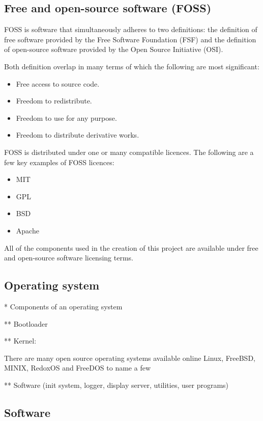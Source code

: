 \subsection{Free and open-source software (FOSS)}

FOSS is software that simultaneously adheres to two definitions: the definition of free software provided by the Free Software Foundation (FSF) and the definition of open-source software provided by the Open Source Initiative (OSI).

Both definition overlap in many terms of which the following are most significant:

\begin{itemize}
    \item Free access to source code.
    \item Freedom to redistribute.
    \item Freedom to use for any purpose.
    \item Freedom to distribute derivative works.
\end{itemize}

FOSS is distributed under one or many compatible licences. The following are a few key examples of FOSS licences:

\begin{itemize}
    \item MIT
    \item GPL
    \item BSD
    \item Apache
\end{itemize}

All of the components used in the creation of this project are available under free and open-source software licensing terms.

\subsection{Operating system}

* Components of an operating system

** Bootloader

** Kernel:

There are many open source operating systems available online Linux, FreeBSD, MINIX, RedoxOS and FreeDOS to name a few 

** Software (init system, logger, display server, utilities, user programs)

\subsection{Software}

